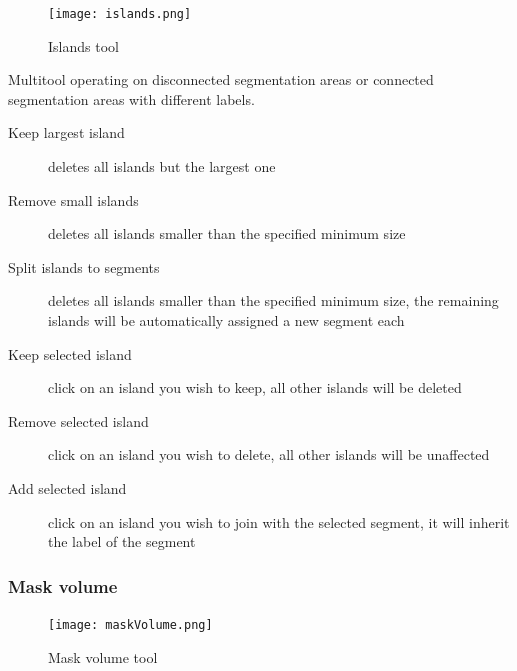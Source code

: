 \begin{figure}[h!]
	\centerline{
		\texttt{[image: islands.png]}}
	\caption{Islands tool}\label{fig:islands}
\end{figure}
\noindent
Multitool operating on disconnected segmentation areas or connected segmentation areas with different labels.
\begin{description}
	\item [Keep largest island] deletes all islands but the largest one
	\item [Remove small islands] deletes all islands smaller than the specified minimum size
	\item [Split islands to segments] deletes all islands smaller than the specified minimum size, the remaining islands will be automatically assigned a new segment each
	\item [Keep selected island] click on an island you wish to keep, all other islands will be deleted
	\item [Remove selected island] click on an island you wish to delete, all other islands will be unaffected
	\item [Add selected island] click on an island you wish to join with the selected segment, it will inherit the label of the segment
\end{description}
\pagebreak

\subsubsection{Mask volume}\label{section:mask}
\begin{figure}[h]
	\begin{subfigure}{0.2\textwidth}
		
	\end{subfigure}
	\begin{subfigure}{0.2\textwidth}
		
	\end{subfigure}
\end{figure}


\begin{figure}[h!]
	\centerline{
		\texttt{[image: maskVolume.png]}}
	\caption{Mask volume tool}\label{fig:mv}
\end{figure}

